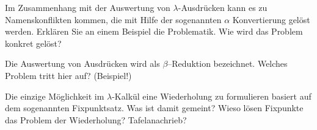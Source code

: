 \begin{card}
	Im Zusammenhang mit der Auswertung von $\lambda$-Ausdrücken kann es zu Namenskonflikten	kommen, die mit Hilfe der sogenannten
	$\alpha$
	Konvertierung gelöst werden. Erklären Sie an einem Beispiel die Problematik. Wie wird das Problem konkret gelöst?
	\hr
\end{card}

\begin{card}
	Die Auswertung von Ausdrücken wird als $\beta$–Reduktion bezeichnet. Welches Problem tritt hier auf? (Beispiel!)
	\hr
\end{card}

\begin{card}
	Die einzige Möglichkeit im $\lambda$-Kalkül eine Wiederholung zu formulieren basiert auf dem sogenannten Fixpunktsatz. Was ist damit gemeint? Wieso lösen Fixpunkte das Problem der Wiederholung? 
	\hr
	Tafelanachrieb?
\end{card}